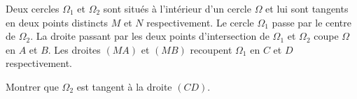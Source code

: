 Deux cercles $\Omega_{1}$ et $\Omega_{2}$ sont situés à l'intérieur d'un cercle $\Omega$ et lui sont tangents en deux points distincts $M$ et $N$ respectivement. Le cercle $\Omega_{1}$ passe par le centre de $\Omega_{2}$. La droite passant par les deux points d'intersection de $\Omega_{1}$ et $\Omega_{2}$ coupe $\Omega$ en $A$ et $B$. Les droites $(MA)$ et $(MB)$ recoupent $\Omega_{1}$ en $C$ et $D$ respectivement.

Montrer que $\Omega_{2}$ est tangent à la droite $(CD)$.
